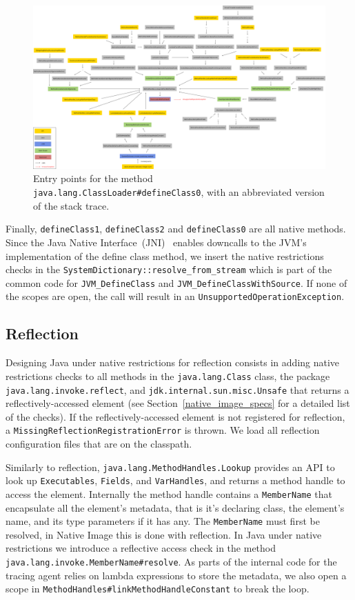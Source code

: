 \begin{figure}
    \centering
    \includegraphics[angle=90,origin=c,scale=0.26]{resources/Group 401.png}
    \caption{Entry points for the method \texttt{java.lang.ClassLoader\#defineClass0}, with an abbreviated version of the stack trace.}
    \label{fig:define_class_0}
\end{figure}

Finally, \verb|defineClass1|, \verb|defineClass2| and \verb|defineClass0| are all native methods. Since the Java Native Interface~(JNI)~\cite{noauthor_jni_nodate} enables downcalls to the JVM's implementation of the define class method, we insert the native restrictions checks in the \verb|SystemDictionary::resolve_from_stream| which is part of the common code for \verb|JVM_DefineClass| and \verb|JVM_DefineClassWithSource|. If none of the scopes are open, the call will result in an \verb|UnsupportedOperationException|. 

\subsection{Reflection}
Designing Java under native restrictions for reflection consists in adding native restrictions checks to all methods in the \verb|java.lang.Class| class, the package \verb|java.lang.invoke.reflect|, and \verb|jdk.internal.sun.misc.Unsafe| that returns a reflectively-accessed element (see Section~\ref{native_image_specs} for a detailed list of the checks). 
If the reflectively-accessed element is not registered for reflection, a \verb|MissingReflectionRegistrationError| is thrown.
We load all reflection configuration files that are on the classpath.

Similarly to reflection, \verb|java.lang.MethodHandles.Lookup| provides an API to look up \verb|Executables|, \verb|Fields|, and \verb|VarHandles|, and returns a method handle to access the element.
Internally the method handle contains a \verb|MemberName| that encapsulate all the element's metadata, that is it's declaring class, the element's name, and its type parameters if it has any. The \verb|MemberName| must first be resolved, in Native Image this is done with reflection.   
In Java under native restrictions we introduce a reflective access check in the method \verb|java.lang.invoke.MemberName#resolve|. As parts of the internal code for the tracing agent relies on lambda expressions to store the metadata, we also open a scope in \verb|MethodHandles#linkMethodHandleConstant| to break the loop.

